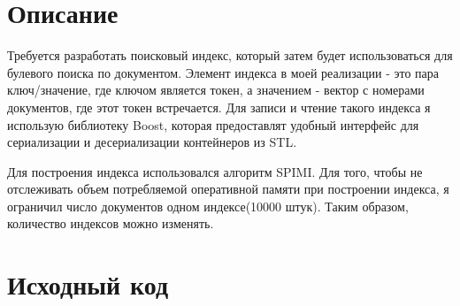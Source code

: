 \section{Описание}
Требуется разработать поисковый индекс, который затем будет использоваться для булевого поиска по документом. Элемент индекса в моей реализации - это пара ключ/значение, где ключом является токен, а значением - вектор с номерами документов, где этот токен встречается. Для записи и чтение такого индекса я использую библиотеку Boost, которая предоставлят удобный интерфейс для сериализации и десериализации контейнеров из STL.

Для построения индекса использовался алгоритм SPIMI. Для того, чтобы не отслеживать объем потребляемой оперативной памяти при построении индекса, я ограничил число документов одном индексе(10000 штук). Таким образом, количество индексов можно изменять.

\pagebreak

\section{Исходный код}

